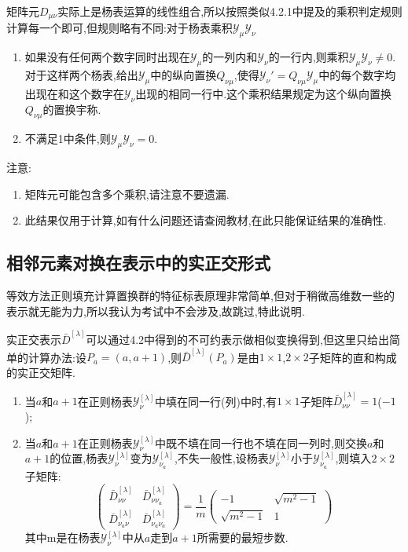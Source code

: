 \documentclass{ctexart}
\begin{document}
矩阵元$D_{\mu\nu}$实际上是杨表运算的线性组合,所以按照类似4.2.1中提及的乘积判定规则计算每一个即可,但规则略有不同:对于杨表乘积$\mathcal{Y}_{\mu}\mathcal{Y}_{\nu}$
\begin{enumerate}
    \item 如果没有任何两个数字同时出现在$\mathcal{Y}_{\mu}$的一列内和$\mathcal{Y}_{\nu}$的一行内,则乘积$\mathcal{Y}_{\mu}\mathcal{Y}_{\nu}\neq 0$.对于这样两个杨表,给出$\mathcal{Y}_{\mu}$中的纵向置换$Q_{\nu\mu}$,使得$\mathcal{Y}_{\nu}'=Q_{\nu\mu}\mathcal{Y}_{\mu}$中的每个数字均出现在和这个数字在$\mathcal{Y}_{\nu}$出现的相同一行中.这个乘积结果规定为这个纵向置换$Q_{\nu\mu}$的置换宇称.
    \item 不满足1中条件,则$\mathcal{Y}_{\mu}\mathcal{Y}_{\nu}=0$.
\end{enumerate}

注意:\begin{enumerate}
    \item 矩阵元可能包含多个乘积,请注意不要遗漏.
    \item 此结果仅用于计算,如有什么问题还请查阅教材,在此只能保证结果的准确性.
\end{enumerate}

\subsection{相邻元素对换在表示中的实正交形式}

等效方法正则填充计算置换群的特征标表原理非常简单,但对于稍微高维数一些的表示就无能为力,所以我认为考试中不会涉及,故跳过,特此说明.

实正交表示$\bar{D}^{[\lambda]}$可以通过4.2中得到的不可约表示做相似变换得到,但这里只给出简单的计算办法:设$P_{a}=(a,a+1)$,则$\bar{D}^{[\lambda]}(P_{a})$是由$1\times 1$,$2\times 2$子矩阵的直和构成的实正交矩阵.
\begin{enumerate}
    \item 当$a$和$a+1$在正则杨表$\mathcal{Y}_{\nu}^{[\lambda]}$中填在同一行(列)中时,有$1\times 1$子矩阵$\bar{D}^{[\lambda]}_{\nu\nu}=1$($-1$);
    \item 当$a$和$a+1$在正则杨表$\mathcal{Y}_{\nu}^{[\lambda]}$中既不填在同一行也不填在同一列时,则交换$a$和$a+1$的位置,杨表$\mathcal{Y}_{\nu}^{[\lambda]}$变为$\mathcal{Y}_{\nu_{a}}^{[\lambda]}$,不失一般性,设杨表$\mathcal{Y}_{\nu}^{[\lambda]}$小于$\mathcal{Y}_{\nu_{a}}^{[\lambda]}$,则填入$2\times 2$子矩阵:\[\begin{pmatrix}
        \bar{D}^{[\lambda]}_{\nu\nu} &\bar{D}^{[\lambda]}_{\nu\nu_{a}}\\
        \bar{D}^{[\lambda]}_{\nu_{a}\nu} &\bar{D}^{[\lambda]}_{\nu_{a}\nu_{a}}
    \end{pmatrix}=\frac{1}{m}\begin{pmatrix}
        -1 &\sqrt{m^{2}-1} \\
        \sqrt{m^{2}-1} &1
    \end{pmatrix}\]
    其中m是在杨表$\mathcal{Y}_{\nu}^{[\lambda]}$中从$a$走到$a+1$所需要的最短步数.
\end{enumerate}
\end{document}
